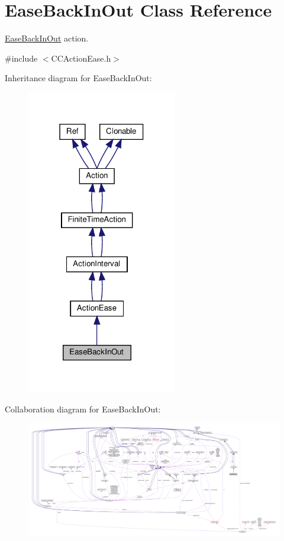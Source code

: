 \hypertarget{classEaseBackInOut}{}\section{Ease\+Back\+In\+Out Class Reference}
\label{classEaseBackInOut}


\hyperlink{classEaseBackInOut}{Ease\+Back\+In\+Out} action.  




{\ttfamily \#include $<$C\+C\+Action\+Ease.\+h$>$}



Inheritance diagram for Ease\+Back\+In\+Out\+:
\nopagebreak
\begin{figure}[H]
\begin{center}
\leavevmode
\includegraphics[width=186pt]{classEaseBackInOut__inherit__graph}
\end{center}
\end{figure}


Collaboration diagram for Ease\+Back\+In\+Out\+:
\nopagebreak
\begin{figure}[H]
\begin{center}
\leavevmode
\includegraphics[width=350pt]{classEaseBackInOut__coll__graph}
\end{center}
\end{figure}
